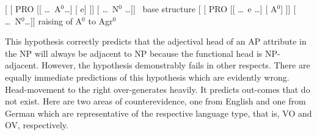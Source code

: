 \documentclass[output=paper
  ,nobabel
  ,uniformtopskip %
]{langscibook}
\begin{document}
\eal
\ex\label{ex-base}{\footnotesize [ [ PRO [[ \ldots\ A$^0$\ldots]
  [ e] ]] [ \ldots\ N$^0$ \ldots]]}~ %
	base structure
\ex\label{ex-raising}{\footnotesize [ [ PRO [[ \ldots\
  e \ldots] [ A$^0$] ]] [ \ldots\ N$^0$\ldots]]}  %
	raising of A$^0$ to Agr$^0$
\zl
\vspace{-1em}

\noindent
This hypothesis correctly predicts that the adjectival head of an AP attribute in the NP will always be adjacent to NP because the functional head is NP-adjacent. However, the hypothesis demonstrably fails in other respects. There are equally immediate predictions of this hypothesis which are evidently wrong. Head-movement to the right over-generates heavily. It predicts out-comes that do not exist. Here are two areas of counterevidence, one from English and one from German which are representative of the respective language type, that is, VO and OV, respectively.
\end{document}
